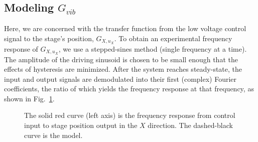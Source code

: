 \documentclass[journal,twocolumn,twoside]{IEEEtran}
\begin{document}
%   
%   

\subsection{Modeling $G_{vib}$}\label{sec:vib_model}
Here, we are concerned with the transfer function from the low voltage control signal to the stage's position, $G_{X,u_X}$. To obtain an experimental frequency response of $G_{X,u_X}$, we use a stepped-sines method (single frequency at a time). The amplitude of the driving sinusoid is chosen to be small enough that the effects of hysteresis are minimized. After the system reaches steady-state, the input and output signals are demodulated into their first (complex) Fourier coefficients, the ratio of which yields the frequency response at that frequency, as shown in Fig.~\ref{fig:Guz2stage_frf}. 

\begin{figure}
  \centering
  
  \caption{The solid red curve (left axis) is the frequency response from control input to stage position output in the $X$ direction. The dashed-black curve is the model.}
  \label{fig:Guz2stage_frf}
\end{figure}
\end{document}
